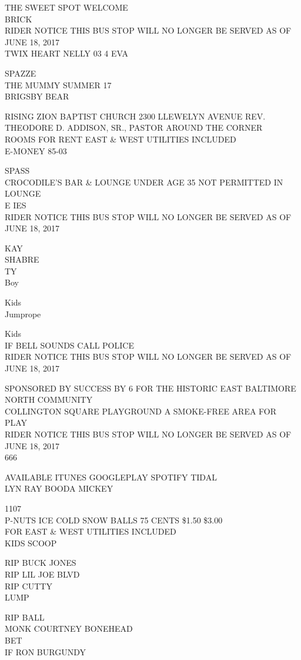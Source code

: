 \documentclass[10pt,letterpaper]{article}
\begin{document}
THE SWEET SPOT WELCOME\\
BRICK\\
RIDER NOTICE THIS BUS STOP WILL NO LONGER BE SERVED AS OF JUNE 18, 2017\\
TWIX HEART NELLY 03 4 EVA

SPAZZE\\
THE MUMMY SUMMER 17\\
BRIGSBY BEAR

RISING ZION BAPTIST CHURCH 2300 LLEWELYN AVENUE REV. THEODORE D. ADDISON, SR., PASTOR AROUND THE CORNER\\
ROOMS FOR RENT EAST \& WEST UTILITIES INCLUDED\\
E{-}MONEY 85{-}03

SPASS\\
CROCODILE'S BAR \& LOUNGE UNDER AGE 35 NOT PERMITTED IN LOUNGE\\
E IES\\
RIDER NOTICE THIS BUS STOP WILL NO LONGER BE SERVED AS OF JUNE 18, 2017

KAY\\
SHABRE\\
TY\\
Boy

Kids\\
Jumprope

Kids\\
IF BELL SOUNDS CALL POLICE\\
RIDER NOTICE THIS BUS STOP WILL NO LONGER BE SERVED AS OF JUNE 18, 2017

SPONSORED BY SUCCESS BY 6 FOR THE HISTORIC EAST BALTIMORE NORTH COMMUNITY\\
COLLINGTON SQUARE PLAYGROUND A SMOKE{-}FREE AREA FOR PLAY\\
RIDER NOTICE THIS BUS STOP WILL NO LONGER BE SERVED AS OF JUNE 18, 2017\\
666

AVAILABLE ITUNES GOOGLEPLAY SPOTIFY TIDAL\\
LYN RAY BOODA MICKEY

1107\\
P{-}NUTS ICE COLD SNOW BALLS 75 CENTS \$1.50 \$3.00\\
FOR EAST \& WEST UTILITIES INCLUDED\\
KIDS SCOOP

RIP BUCK JONES\\
RIP LIL JOE BLVD\\
RIP CUTTY\\
LUMP

RIP BALL\\
MONK COURTNEY BONEHEAD\\
BET\\
IF RON BURGUNDY
\end{document}
